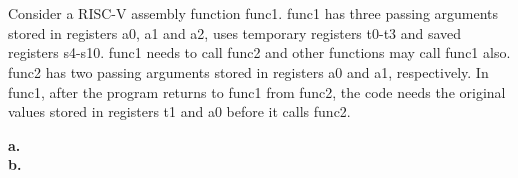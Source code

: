 \documentclass[12pt]{article}
\begin{document}
    \section{}
    \begin{flushleft}
        Consider a RISC-V assembly function func1. func1 has three passing
        arguments stored in registers a0, a1 and a2, uses temporary registers t0-t3 and
        saved registers s4-s10. func1 needs to call func2 and other functions may call func1
        also. func2 has two passing arguments stored in registers a0 and a1, respectively. In
        func1, after the program returns to func1 from func2, the code needs the original
        values stored in registers t1 and a0 before it calls func2.
    \end{flushleft}
    \textbf{a.}
     \\
    \textbf{b.}
    
    \newpage
\end{document}
